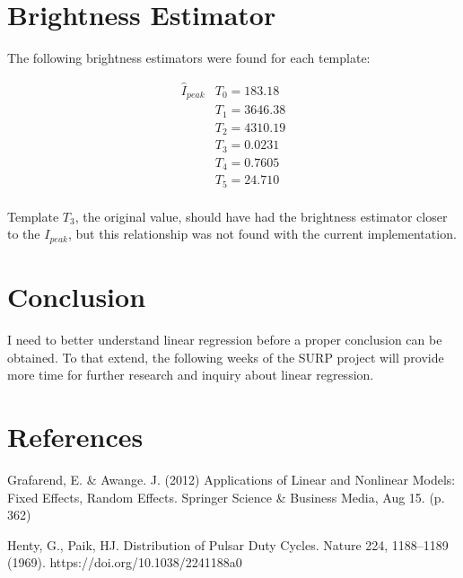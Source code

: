 \documentclass{article}
\begin{document}
\section{Brightness Estimator}

The following brightness estimators were found for each template:

\begin{align*}
    \hat{I}_{peak} & T_{0} = 183.18\\
    & T_{1} = 3646.38\\
    & T_{2} = 4310.19\\
    & T_{3} = 0.0231\\
    & T_{4} = 0.7605\\
    & T_{5} = 24.710\\
\end{align*}

Template $T_{3}$, the original value, should have had the brightness estimator closer to the $I_{peak}$, but this relationship was not found with the current implementation.

\section{Conclusion}

I need to better understand linear regression before a proper conclusion can be obtained. To that extend, the following weeks of the SURP project will provide more time for further research and inquiry about linear regression.

\section{References}

Grafarend, E. \& Awange. J. (2012) Applications of Linear and Nonlinear Models:
Fixed Effects, Random Effects. Springer Science \& Business Media, Aug 15.
(p. 362)

Henty, G., Paik, HJ. Distribution of Pulsar Duty Cycles. Nature 224, 1188–1189
(1969). https://doi.org/10.1038/2241188a0
\end{document}
